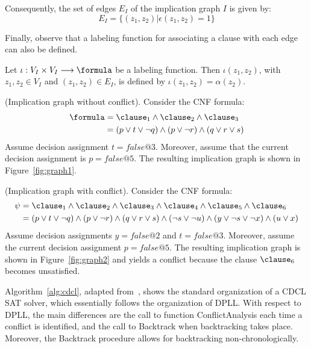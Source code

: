 Consequently, the set of edges $E_I$ of the implication graph $I$ is given by:
\begin{equation}
    E_I = \{ (z_1, z_2) | \epsilon(z_1, z_2) = 1\}
\end{equation}

Finally, observe that a labeling function for associating a clause with each
edge can also be defined. 

\begin{definition}
    Let $\iota : V_I \times V_I \longrightarrow \formula$ be a labeling
    function. Then $\iota(z_1, z_2)$, with $z_1, z_2 \in V_I$ and $(z_1, z_2)
    \in E_I$, is defined by $\iota(z_1, z_2) = \alpha(z_2)$.
\end{definition}

\begin{example}%
    \label{ex:graph1}
    (Implication graph without conflict). Consider the CNF formula:
    \begin{align*}
        \formula & = \clause_1 \land \clause_2 \land \clause_3\\
                 & = (p \lor t \lor \neg q) \land (p \lor \neg r) \land (q \lor r \lor s)
    \end{align*}
    Assume decision assignment $t = false@3$. Moreover, assume that the current
    decision assignment is $p = false@5$. The resulting implication graph is
    shown in Figure~\ref{fig:graph1}.
    
\end{example}

\begin{example}%
    \label{ex:graph2}
    (Implication graph with conflict). Consider the CNF formula:
    \begin{align*}
        \psi & = \clause_1 \land \clause_2 \land \clause_3 \land \clause_4 \land \clause_5 \land \clause_6  \\
                 & = (p \lor t \lor \neg q) \land (p \lor \neg r) \land (q \lor r \lor s) \land (\neg s \lor \neg u) \land (y \lor \neg s \lor \neg x) \land (u \lor x)
    \end{align*}
    Assume decision assignments $y = false@2$ and $t = false@3$. Moreover,
    assume the current decision assignment $p = false@5$. The resulting
    implication graph is shown in Figure~\ref{fig:graph2} and yields a conflict
    because the clause $\clause_6$ becomes unsatisfied.
    
\end{example}

Algorithm~\ref{alg:cdcl}, adapted from~\cite{cdclchapter}, shows the standard
organization of a CDCL SAT solver, which essentially follows the organization of
DPLL\@. With respect to DPLL, the main differences are the call to function
ConflictAnalysis each time a conflict is identified, and the call to Backtrack
when backtracking takes place. Moreover, the Backtrack procedure allows for
backtracking non-chronologically. 

